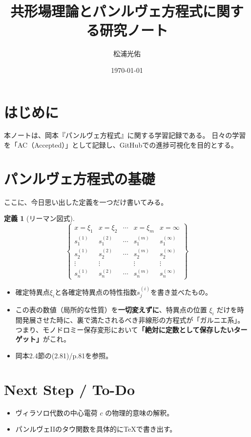 \documentclass[paper=a4, fontsize=11pt]{jlreq} %
\title{共形場理論とパンルヴェ方程式に関する研究ノート}
\author{松浦光佑}
\date{\today}
\theoremstyle{definition}
\newtheorem{definition}[theorem]{定義}
\begin{document}
\maketitle
\tableofcontents %

\section{はじめに}
本ノートは、岡本『パンルヴェ方程式』に関する学習記録である。
日々の学習を「AC（Accepted）」として記録し、GitHubでの進捗可視化を目的とする。

\section{パンルヴェ方程式の基礎}
ここに、今日思い出した定義を一つだけ書いてみる。
\begin{definition}[リーマン図式]
    \[
    \left\{
    \begin{matrix}
        x = \xi_1 & x = \xi_2 & \cdots & x = \xi_m & x = \infty \\
        s_1^{(1)} & s_1^{(2)} & \cdots & s_1^{(m)} & s_1^{(\infty)} \\
        s_2^{(1)} & s_2^{(2)} & \cdots & s_2^{(m)} & s_2^{(\infty)} \\
        \vdots    & \vdots    &        & \vdots    & \vdots \\
        s_n^{(1)} & s_n^{(2)} & \cdots & s_n^{(m)} & s_n^{(\infty)}
    \end{matrix}
    \right\}
    \]
    \begin{itemize}
        \item[\textbf{Type:}] 確定特異点$\xi_{i}$と各確定特異点の特性指数$s_j^{(i)}$を書き並べたもの。
        \item[\textbf{Insight:}] この表の数値（局所的な性質）を\textbf{一切変えずに}、特異点の位置 $\xi_i$ だけを時間発展させた時に、裏で満たされるべき非線形の方程式が「ガルニエ系」。つまり、モノドロミー保存変形において\textbf{「絶対に定数として保存したいターゲット」}がこれ。
        \item[\textbf{Link:}] 岡本2.4節の(2.81)/p.81を参照。
    \end{itemize}
\end{definition}



\section{Next Step / To-Do}
\begin{itemize}
    \item [ ] ヴィラソロ代数の中心電荷 $c$ の物理的意味の解釈。
    \item [ ] パンルヴェIIのタウ関数を具体的にTeXで書き出す。
\end{itemize}
\end{document}
